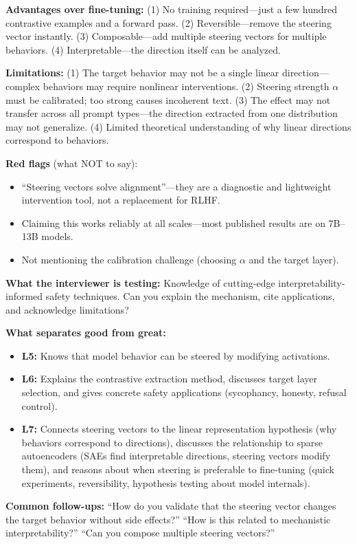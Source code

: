 \begin{interviewq}
\textbf{Advantages over fine-tuning:} (1) No training required---just a few hundred contrastive examples and a forward pass. (2) Reversible---remove the steering vector instantly. (3) Composable---add multiple steering vectors for multiple behaviors. (4) Interpretable---the direction itself can be analyzed.

\textbf{Limitations:} (1) The target behavior may not be a single linear direction---complex behaviors may require nonlinear interventions. (2) Steering strength $\alpha$ must be calibrated; too strong causes incoherent text. (3) The effect may not transfer across all prompt types---the direction extracted from one distribution may not generalize. (4) Limited theoretical understanding of why linear directions correspond to behaviors.

\textbf{Red flags} (what NOT to say):
\begin{itemize}
    \item ``Steering vectors solve alignment''---they are a diagnostic and lightweight intervention tool, not a replacement for RLHF.
    \item Claiming this works reliably at all scales---most published results are on 7B--13B models.
    \item Not mentioning the calibration challenge (choosing $\alpha$ and the target layer).
\end{itemize}

\textbf{What the interviewer is testing:} Knowledge of cutting-edge interpretability-informed safety techniques. Can you explain the mechanism, cite applications, and acknowledge limitations?

\textbf{What separates good from great:}
\begin{itemize}
    \item \textbf{L5:} Knows that model behavior can be steered by modifying activations.
    \item \textbf{L6:} Explains the contrastive extraction method, discusses target layer selection, and gives concrete safety applications (sycophancy, honesty, refusal control).
    \item \textbf{L7:} Connects steering vectors to the linear representation hypothesis (why behaviors correspond to directions), discusses the relationship to sparse autoencoders (SAEs find interpretable directions, steering vectors modify them), and reasons about when steering is preferable to fine-tuning (quick experiments, reversibility, hypothesis testing about model internals).
\end{itemize}

\textbf{Common follow-ups:} ``How do you validate that the steering vector changes the target behavior without side effects?'' ``How is this related to mechanistic interpretability?'' ``Can you compose multiple steering vectors?''
\end{interviewq}
